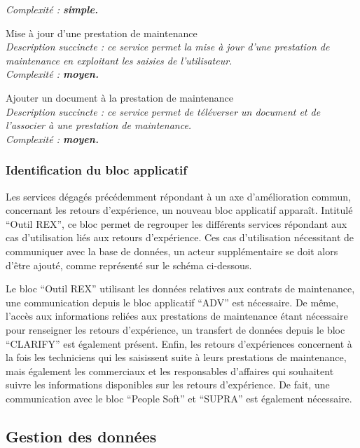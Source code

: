 \begin{description}
        \it{Complexité :} \bf{simple}.
    \item[\textbullet] Mise à jour d’une prestation de maintenance \\
        \it{Description succincte :} ce service permet la mise à jour d’une prestation de maintenance en exploitant les saisies de l’utilisateur. \\
        \it{Complexité :} \bf{moyen}.
    \item[\textbullet] Ajouter un document à la prestation de maintenance \\
        \it{Description succincte :} ce service permet de téléverser un document et de l’associer à une prestation de maintenance. \\
        \it{Complexité :} \bf{moyen}.
\end{description}

\subsubsection{Identification du bloc applicatif}

Les services dégagés précédemment répondant à un axe d’amélioration commun, concernant les retours d’expérience, un nouveau bloc applicatif apparaît. Intitulé “Outil REX”, ce bloc permet de regrouper les différents services répondant aux cas d’utilisation liés aux retours d’expérience. Ces cas d’utilisation nécessitant de communiquer avec la base de données, un acteur supplémentaire se doit alors d’être ajouté, comme représenté sur le schéma ci-dessous.


Le bloc “Outil REX” utilisant les données relatives aux contrats de maintenance, une communication depuis le bloc applicatif “ADV” est nécessaire. De même, l’accès aux informations reliées aux prestations de maintenance étant nécessaire pour renseigner les retours d’expérience, un transfert de données depuis le bloc “CLARIFY” est également présent. Enfin, les retours d’expériences concernent à la fois les techniciens qui les saisissent suite à leurs prestations de maintenance, mais également les commerciaux et les responsables d’affaires qui souhaitent suivre les informations disponibles sur les retours d’expérience. De fait, une communication avec le bloc “People Soft” et “SUPRA” est également nécessaire.


\subsection{Gestion des données}


